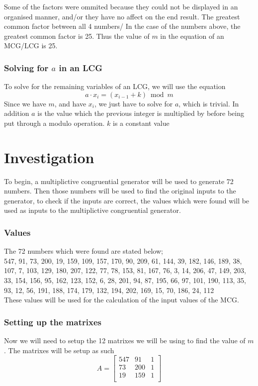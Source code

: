 \documentclass[12pft, english]{article}
\begin{document}
\begin{multicols}{2}
  Some of the factors were ommited because they could not be displayed in an organised manner, and/or they have no affect on the end result. The greatest common factor between all 4 numbers/
  In the case of the numbers above, the greatest common factor is 25. Thus the value of \(m\) in the equation of an MCG/LCG is 25.

  \subsubsection{Solving for \(a\) in an LCG}
  To solve for the remaining variables of an LCG, we will use the equation
  \[a \cdot x_{i} = (x_{i-1} + k) \bmod m\]
  Since we have \(m\), and have \(x_{i}\), we just have to solve for \(a\), which is trivial. In addition \(a\) is the value which the previous integer is multiplied by before being put through a modulo operation. \(k\) is a constant value

  \section{Investigation}
  To begin, a multiplictive congruential generator will be used to generate 72 numbers. Then those numbers will be used to find the original inputs to the generator, to check if the inputs are correct, the values which were found will be used as inputs to the multiplictive congruential generator.
  \subsubsection{Values}
  The 72 numbers which were found are stated below; \\
  547, 91, 73, 200, 19, 159, 109, 157, 170, 90, 209, 61, 144, 39, 182, 146, 189, 38, 107, 7, 103, 129, 180, 207, 122, 77, 78, 153, 81, 167, 76, 3, 14, 206, 47, 149, 203, 33, 154, 156, 95, 162, 123, 152, 6, 28, 201, 94, 87, 195, 66, 97, 101, 190, 113, 35, 93, 12, 56, 191, 188, 174, 179, 132, 194, 202, 169, 15, 70, 186, 24, 112 \\
  These values will be used for the calculation of the input values of the MCG.
  \subsubsection{Setting up the matrixes}
  Now we will need to setup the 12 matrixes we will be using to find the value of \(m\). The matrixes will be setup as such
  \[
    A =
    \begin{bmatrix}
      547 & 91  & 1 \\
      73  & 200 & 1 \\
      19  & 159 & 1\\
    \end{bmatrix}
  \]


\end{multicols}
\end{document}
